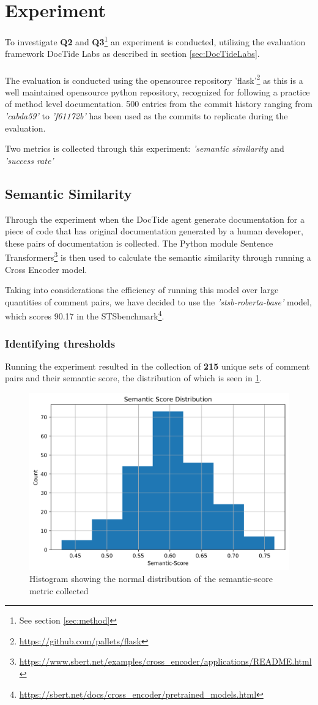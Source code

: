 \section{Experiment}
\label{sec:exp}
To investigate \textbf{Q2} and \textbf{Q3}\footnote{See section \ref{sec:method}} an experiment is conducted, utilizing the evaluation framework DocTide Labs as described in section \ref{sec:DocTideLabs}. 
\\ \\
The evaluation is conducted using the opensource repository 'flask'\footnote{\url{https://github.com/pallets/flask}} as this is a well maintained opensource python repository, recognized for following a practice of method level documentation. 500 entries from the commit history ranging from \textit{'cabda59'} to \textit{'f61172b'} has been used as the commits to replicate during the evaluation.

Two metrics is collected through this experiment: \textit{'semantic similarity} and \textit{'success rate'}

\subsection{Semantic Similarity}
Through the experiment when the DocTide agent generate documentation for a piece of code that has original documentation generated by a human developer, these pairs of documentation is collected. The Python module Sentence Transformers\footnote{\url{https://www.sbert.net/examples/cross_encoder/applications/README.html}} is then used to calculate the semantic similarity through running a Cross Encoder model.

Taking into considerations the efficiency of running this model over large quantities of comment pairs, we have decided to use the \textit{'stsb-roberta-base'} model, which scores 90.17 in the STSbenchmark\footnote{\url{https://sbert.net/docs/cross_encoder/pretrained_models.html}}.
\subsubsection{Identifying thresholds}
\label{sec:identifying thresholds}
Running the experiment resulted in the collection of \textbf{215} unique sets of comment pairs and their semantic score, the distribution of which is seen in \cref{fig:sem_hist}.
\begin{figure}[H]
\centering
\includegraphics[width=0.7\linewidth]{Figures/semantic_score_histogram.png}
\caption{Histogram showing the normal distribution of the semantic-score metric collected}
\label{fig:sem_hist}
\end{figure}

